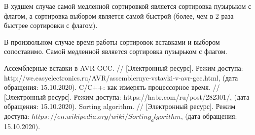 \documentclass[utf8x, 12pt]{G7-32}
\begin{document}
    В худшем случае самой медленной сортировкой является сортировка пузырьком с флагом,
    а сортировка выбором является самой быстрой (более, чем в 2 раза быстрее сортировки с флагом).

    В произвольном случае время работы сортировок вставками и выбором сопоставимо.
    Самой медленной является сортировка пузырьком с флагом.
 
\begin{thebibliography}{}
      Ассемблерные вставки в AVR-GCC. // [Электронный ресурс]. Режим доступа: http://we.easyelectronics.ru/AVR/assemblernye-vstavki-v-avr-gcc.html, (дата обращения: 15.10.2020).
      C/C++: как измерять процессорное время. // [Электронный ресурс]. Режим доступа: https://habr.com/ru/post/282301/, (дата обращения: 15.10.2020).
      Sorting algorithm. // [Электронный ресурс]. Режим доступа: $https://en.wikipedia.org/wiki/Sorting_algorithm$, (дата обращения: 15.10.2020).
\end{thebibliography}
\end{document}
